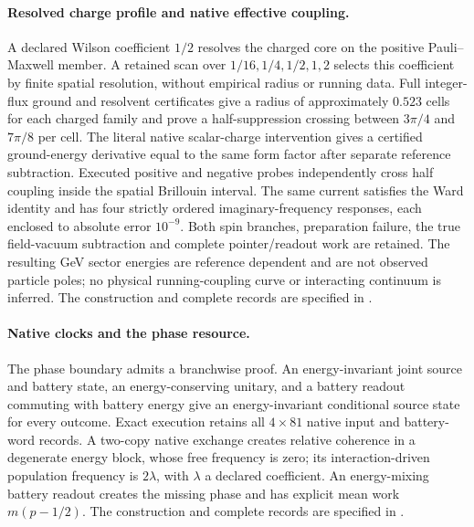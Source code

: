 \paragraph{Resolved charge profile and native effective coupling.}
A declared Wilson coefficient $1/2$ resolves the charged core on the
positive Pauli--Maxwell member. A retained scan over $1/16,1/4,1/2,1,2$
selects this coefficient by finite spatial resolution, without empirical
radius or running data. Full integer-flux ground and resolvent certificates
give a radius of approximately $0.523$ cells for each charged family and
prove a half-suppression crossing between $3\pi/4$ and $7\pi/8$ per cell.
The literal native scalar-charge intervention gives a certified ground-energy
derivative equal to the same form factor after separate reference subtraction.
Executed positive and negative probes independently cross half coupling
inside the spatial Brillouin interval. The same current satisfies the Ward identity and has four strictly ordered
imaginary-frequency responses, each enclosed to absolute error $10^{-9}$.
Both spin branches, preparation failure, the true field-vacuum subtraction
and complete pointer/readout work are retained. The resulting GeV sector
energies are reference dependent and are not observed particle poles; no
physical running-coupling curve or interacting continuum is inferred.
The construction and complete records are specified in .

\paragraph{Native clocks and the phase resource.}
The phase boundary admits a branchwise proof. An energy-invariant joint
source and battery state, an energy-conserving unitary, and a battery
readout commuting with battery energy give an energy-invariant conditional
source state for every outcome. Exact execution retains all $4\times81$
native input and battery-word records. A two-copy native exchange creates
relative coherence in a degenerate energy block, whose free frequency is
zero; its interaction-driven population frequency is $2\lambda$, with
$\lambda$ a declared coefficient. An energy-mixing battery readout creates
the missing phase and has explicit mean work $m(p-1/2)$.
The construction and complete records are specified in .

